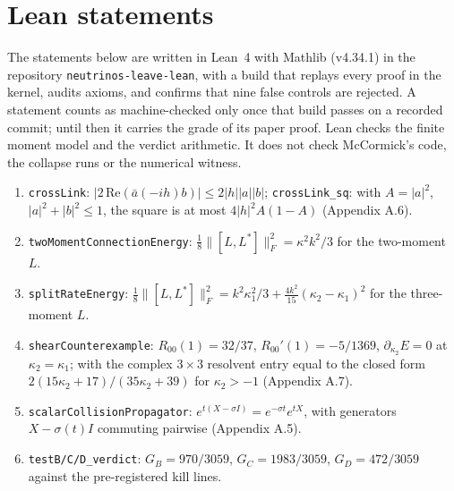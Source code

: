 \documentclass[11pt]{article}
\begin{document}
\section{Lean statements}
The statements below are written in Lean~4 with Mathlib (v4.34.1) in the repository \texttt{neutrinos-leave-lean}, with a build that replays every proof in the kernel, audits axioms, and confirms that nine false controls are rejected. A statement counts as machine-checked only once that build passes on a recorded commit; until then it carries the grade of its paper proof. Lean checks the finite moment model and the verdict arithmetic. It does not check McCormick's code, the collapse runs or the numerical witness.
\begin{enumerate}
\item \texttt{crossLink}: $|2\,\mathrm{Re}(\bar a(-ih)b)|\le2|h||a||b|$; \texttt{crossLink\_sq}: with $A=|a|^2$, $|a|^2+|b|^2\le1$, the square is at most $4|h|^2A(1-A)$ (Appendix A.6).
\item \texttt{twoMomentConnectionEnergy}: $\tfrac18\lVert[L,L^\ast]\rVert_F^2=\kappa^2k^2/3$ for the two-moment $L$.
\item \texttt{splitRateEnergy}: $\tfrac18\lVert[L,L^\ast]\rVert_F^2=k^2\kappa_1^2/3+\tfrac{4k^2}{15}(\kappa_2-\kappa_1)^2$ for the three-moment $L$.
\item \texttt{shearCounterexample}: $R_{00}(1)=32/37$, $R_{00}'(1)=-5/1369$, $\partial_{\kappa_2}E=0$ at $\kappa_2=\kappa_1$; with the complex $3\times3$ resolvent entry equal to the closed form $2(15\kappa_2+17)/(35\kappa_2+39)$ for $\kappa_2>-1$ (Appendix A.7).
\item \texttt{scalarCollisionPropagator}: $e^{t(X-\sigma I)}=e^{-\sigma t}e^{tX}$, with generators $X-\sigma(t)I$ commuting pairwise (Appendix A.5).
\item \texttt{testB/C/D\_verdict}: $G_B=970/3059$, $G_C=1983/3059$, $G_D=472/3059$ against the pre-registered kill lines.
\end{enumerate}
\end{document}

